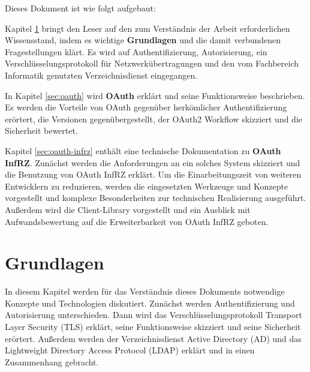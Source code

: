 \documentclass[12pt,a4paper,pointednumbers,abstracton]{scrartcl}
\newcommand{\deactivate}[1]{}
\begin{document}
Dieses Dokument ist wie folgt aufgebaut:

\deactivate{
Kapitel \ref{sec:einleitung} liefert eine \textbf{Einleitung} in die Materie und soll OAuth InfRZ in einen Kontext bringen.
Es wird die Relevanz eines SSO-Dienstes erörtert, eine Implementierungsmöglichkeit skizziert und eine Zusammenfassung zu jedem Kapitel gegeben.
}

Kapitel \ref{sec:basics} bringt den Leser auf den zum Verständnis der Arbeit erforderlichen Wissensstand, indem es wichtige \textbf{Grundlagen} und die damit verbundenen Fragestellungen klärt.
Es wird auf Authentifizierung, Autorisierung, ein Verschlüsselungsprotokoll für Netzwerkübertragungen und den vom Fachbereich Informatik genutzten Verzeichnisdienst eingegangen.

In Kapitel \ref{sec:oauth} wird \textbf{OAuth} erklärt und seine Funktionsweise beschrieben.
Es werden die Vorteile von OAuth gegenüber herkömlicher Authentifizierung erörtert, die Versionen gegenübergestellt, der OAuth2 Workflow skizziert und die Sicherheit bewertet.

Kapitel \ref{sec:oauth-infrz} enthält eine technische Dokumentation zu \textbf{OAuth InfRZ}.
Zunächst werden die Anforderungen an ein solches System skizziert und die Benutzung von OAuth InfRZ erklärt.
Um die Einarbeitungszeit von weiteren Entwicklern zu reduzieren, werden die eingesetzten Werkzeuge und Konzepte vorgestellt und komplexe Besonderheiten zur technischen Realisierung ausgeführt.
Außerdem wird die Client-Library vorgestellt und ein Ausblick mit Aufwandsbewertung auf die Erweiterbarkeit von OAuth InfRZ geboten.


\newpage
\section{Grundlagen}
\label{sec:basics}

In diesem Kapitel werden für das Verständnis dieses Dokuments notwendige Konzepte und Technologien diskutiert.
Zunächst werden Authentifizierung und Autorisierung unterschieden.
Dann wird das Verschlüsselungsprotokoll Transport Layer Security (TLS) erklärt, seine Funktionsweise skizziert und seine Sicherheit erörtert.
Außerdem werden der Verzeichnisdienst Active Directory (AD) und das Lightweight Directory Access Protocol (LDAP) erklärt und in einen Zusammenhang gebracht.
\end{document}
